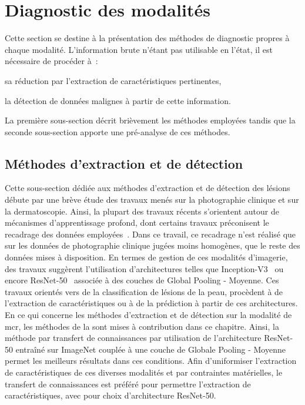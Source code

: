 \section{Diagnostic des modalités}
\label{sec:modality_diagnosis}
Cette section se destine à la présentation des méthodes de diagnostic propres à chaque modalité. L'information brute n'étant pas utilisable en l'état, il est nécessaire de procéder à~:
\begin{inlinerate}
    \item sa réduction par l'extraction de caractéristiques pertinentes,
    \item la détection de données malignes à partir de cette information.
\end{inlinerate} La première sous-section décrit brièvement les méthodes employées tandis que la seconde sous-section apporte une pré-analyse de ces méthodes.\par

\subsection{Méthodes d'extraction et de détection}
Cette sous-section dédiée aux méthodes d'extraction et de détection des lésions débute par une brève étude des travaux menés sur la photographie clinique et sur la dermatoscopie. Ainsi, la plupart des travaux récents s'orientent autour de mécanismes d'apprentissage profond, dont certains travaux préconisent le recadrage des données employées~\cite{Li2018}. Dans ce travail, ce recadrage n'est réalisé que sur les données de photographie clinique jugées moins homogènes, que le reste des données mises à disposition. En termes de gestion de ces modalités d'imagerie, des travaux suggèrent l'utilisation d'architectures telles que Inception-V3~\cite{Esteva2017,Fan2020} ou encore ResNet-50~\cite{Xie2018, Alantari2018} associée à des couches de Global Pooling - Moyenne. Ces travaux orientés vers de la classification de lésions de la peau, procèdent à de l'extraction de caractéristiques ou à de la prédiction à partir de ces architectures. En ce qui concerne les méthodes d'extraction et de détection sur la modalité de \gls{mcr}, les méthodes de la  sont mises à contribution dans ce chapitre. Ainsi, la méthode par transfert de connaissances par utilisation de l'architecture ResNet-50 entraîné sur ImageNet couplée à une couche de Globale Pooling - Moyenne permet les meilleurs résultats dans ces conditions. Afin d'uniformiser l'extraction de caractéristiques de ces diverses modalités et par contraintes matérielles, le transfert de connaissances est préféré pour permettre l'extraction de caractéristiques, avec pour choix d'architecture ResNet-50.\par

